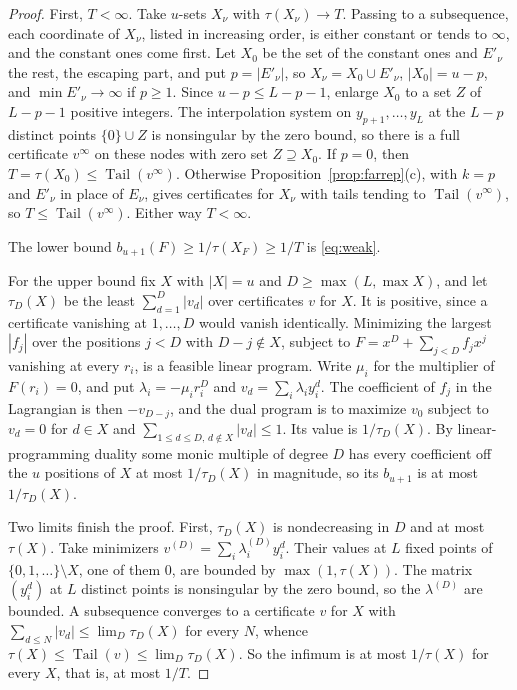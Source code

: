 \documentclass[11pt]{article}
\theoremstyle{definition}
\theoremstyle{plain}
\DeclareMathOperator{\Tail}{Tail}
\begin{document}
\begin{proof}
First, $T<\infty$.  Take $u$-sets $X_\nu$ with $\tau(X_\nu)\to T$.
Passing to a subsequence, each coordinate of $X_\nu$, listed in increasing
order, is either constant or tends to $\infty$, and the constant ones come
first.  Let $X_0$ be the set of the constant ones and $E'_\nu$ the rest, the
escaping part, and put $p=|E'_\nu|$, so $X_\nu=X_0\cup E'_\nu$, $|X_0|=u-p$,
and $\min E'_\nu\to\infty$ if $p\ge1$.  Since $u-p\le L-p-1$, enlarge $X_0$
to a set $Z$ of $L-p-1$ positive integers.  The interpolation system on
$y_{p+1},\ldots,y_L$ at the $L-p$ distinct points $\{0\}\cup Z$ is
nonsingular by the zero bound, so there is a full certificate $v^\infty$ on
these nodes with zero set $Z\supseteq X_0$.  If $p=0$, then
$T=\tau(X_0)\le\Tail(v^\infty)$.  Otherwise
Proposition~\ref{prop:farrep}(c), with $k=p$ and $E'_\nu$ in place of
$E_\nu$, gives certificates for $X_\nu$ with tails tending to
$\Tail(v^\infty)$, so $T\le\Tail(v^\infty)$.  Either way $T<\infty$.

The lower bound $b_{u+1}(F)\ge1/\tau(X_F)\ge1/T$ is \eqref{eq:weak}.

For the upper bound fix $X$ with $|X|=u$ and $D\ge\max(L,\max X)$, and let
$\tau_D(X)$ be the least $\sum_{d=1}^D|v_d|$ over certificates $v$ for $X$.
It is positive, since a certificate vanishing at $1,\ldots,D$ would vanish
identically.  Minimizing the largest $|f_j|$ over the positions $j<D$ with
$D-j\notin X$, subject to $F=x^D+\sum_{j<D}f_jx^j$ vanishing at every $r_i$,
is a feasible linear program.  Write $\mu_i$ for the multiplier of
$F(r_i)=0$, and put $\lambda_i=-\mu_ir_i^D$ and $v_d=\sum_i\lambda_iy_i^d$.
The coefficient of $f_j$ in the Lagrangian is then $-v_{D-j}$, and the dual
program is to maximize $v_0$ subject to $v_d=0$ for $d\in X$ and
$\sum_{1\le d\le D,\,d\notin X}|v_d|\le1$.  Its value is $1/\tau_D(X)$.  By
linear-programming duality some monic multiple of degree $D$ has every
coefficient off the $u$ positions of $X$ at most $1/\tau_D(X)$ in magnitude,
so its $b_{u+1}$ is at most $1/\tau_D(X)$.

Two limits finish the proof.  First, $\tau_D(X)$ is nondecreasing in $D$ and
at most $\tau(X)$.  Take minimizers $v^{(D)}=\sum_i\lambda^{(D)}_iy_i^d$.
Their values at $L$ fixed points of $\{0,1,\ldots\}\setminus X$, one of them
$0$, are bounded by $\max(1,\tau(X))$.  The matrix $(y_i^d)$ at $L$ distinct
points is nonsingular by the zero bound, so the $\lambda^{(D)}$ are bounded.
A subsequence converges to a certificate $v$ for $X$ with
$\sum_{d\le N}|v_d|\le\lim_D\tau_D(X)$ for every $N$, whence
$\tau(X)\le\Tail(v)\le\lim_D\tau_D(X)$.  So the infimum is at most $1/\tau(X)$
for every $X$, that is, at most $1/T$.


\end{proof}
\end{document}
